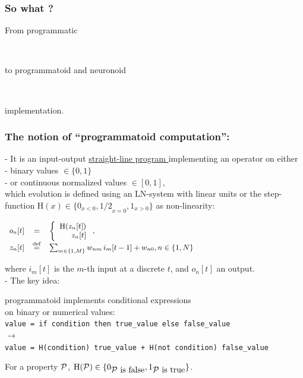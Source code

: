 \documentclass{beamer}
\newcommand{\hrefc}[2]{\href{#1}{{#2 \CheckedBox}}}
\newcommand{\eqline}[1]{~\vspace{0.1cm}\\\centerline{$#1$}\vspace{0.1cm}}
\newcommand{\defq}{\stackrel {\rm def}{=}}
\newcommand{\tab}{\hphantom{4mm}}
\begin{document}
\begin{frame}
  \frametitle{So what ?}
  \centerline{\huge From programmatic} ~\\ \centerline{\huge to programmatoid and neuronoid} ~\\ \centerline{\huge implementation.}
\end{frame}

\begin{frame}
  \frametitle{The notion of ``programmatoid computation'':}
- It is an input-output \hrefc{https://en.wikipedia.org/wiki/Straight-line_program}{straight-line program} implementing an operator on either {\small \\\tab - binary values $\in \{0, 1\}$ \\\tab - or continuous normalized values $\in [0, 1]$,} \\ which evolution is defined using an LN-system with linear units or the step-function $\mbox{H}(x) \in \{0_{x < 0}, {1/2}_{x = 0}, 1_{x >0}\}$ as non-linearity:
\eqline{\small \begin{array}{rcl} o_n[t] &=& \left\{ \begin{array}{r} \mbox{H}(z_n[t]) \\ z_n[t] \\ \end{array} \right., \\ z_n[t] &\defq& \sum_{m\in\{1,M\}} w_{nm} \, i_m[t-1] + w_{n0}, n \in \{1, N\} \\ \end{array}}
where $i_m[t]$ is the $m$-th input at a discrete $t$, and $o_n[t]$ an output.
~\\ - The key idea: \vspace{-3mm} \begin{center} {\small programmatoid implements conditional expressions \\ on binary or numerical values:} \vspace{2mm} \\ {\tt \tiny value = if condition then true\_value else false\_value \\ $\longrightarrow$ \vspace{-2mm} \\ value = H(condition) true\_value + H(not condition) false\_value} \end{center}
{\small For a property ${\cal P}$, $\mbox{H}({\cal P}) \in \{0_{\mbox{${\cal P}$ is false}}, 1_{\mbox{${\cal P}$ is true}}\}$.}
\end{frame}
\end{document}
